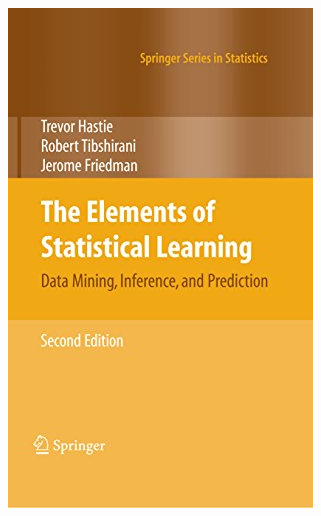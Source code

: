 \documentclass{presentation_template}
\begin{document}
\begin{frame}
\begin{columns}
\begin{column}{0.2\textwidth}  %
    \vspace{-0.5cm}
    \begin{figure}
        \includegraphics[width=\textwidth]{Figures/the_element.jpg}
    \end{figure}
\end{column}
\end{columns}



\end{frame}
\end{document}
